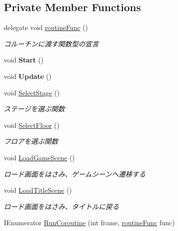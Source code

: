 \subsection*{Private Member Functions}
\begin{DoxyCompactItemize}
\item 
delegate void \hyperlink{class_stage_select_a6b3980abcd91e390c76fc5f914554bbe}{routine\+Func} ()
\begin{DoxyCompactList}\small\item\em コルーチンに渡す関数型の宣言 \end{DoxyCompactList}\item 
\mbox{\label{class_stage_select_a75b54045db860921218319751b9771a3}} 
void {\bfseries Start} ()
\item 
\mbox{\label{class_stage_select_a8e2086960e7e124beccbd0bab2daee38}} 
void {\bfseries Update} ()
\item 
void \hyperlink{class_stage_select_a81b600e66141ab90bd9f48dc5f737db0}{Select\+Stage} ()
\begin{DoxyCompactList}\small\item\em ステージを選ぶ関数 \end{DoxyCompactList}\item 
void \hyperlink{class_stage_select_aa194326736d1553ee134ad21d90ab832}{Select\+Floor} ()
\begin{DoxyCompactList}\small\item\em フロアを選ぶ関数 \end{DoxyCompactList}\item 
void \hyperlink{class_stage_select_af7b468e46ddc79c41cecd72885256cb1}{Load\+Game\+Scene} ()
\begin{DoxyCompactList}\small\item\em ロード画面をはさみ、ゲームシーンへ遷移する \end{DoxyCompactList}\item 
void \hyperlink{class_stage_select_a38cbfdf8ea97f93d93b03b4d4cca0b5b}{Load\+Title\+Scene} ()
\begin{DoxyCompactList}\small\item\em ロード画面をはさみ、タイトルに戻る \end{DoxyCompactList}\item 
I\+Enumerator \hyperlink{class_stage_select_ab76ca4f38ca97ab7afbacc44efb99ef2}{Run\+Coroutine} (int frame, \hyperlink{class_stage_select_a6b3980abcd91e390c76fc5f914554bbe}{routine\+Func} func)

\end{DoxyCompactItemize}
